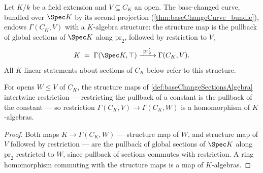 \begin{definition}
  \label{def:baseChangeSectionsAlgebra}
  \leanok
  Let \(K/k\) be a field extension and \(V \subseteq C_K\) an open. The base-changed
  curve, bundled over \(\Spec K\) by its second projection
  (\ref{thm:baseChangeCurve_bundle}), endows \(\Gamma(C_K, V)\) with a \(K\)-algebra
  structure: the structure map is the pullback of global sections of \(\Spec K\) along
  \(\mathrm{pr}_2\), followed by restriction to \(V\),
  \[
    K \;=\; \Gamma(\Spec K, \top) \xrightarrow{\ \mathrm{pr}_2^{\sharp}\ }
      \Gamma(C_K, V).
  \]
  All \(K\)-linear statements about sections of \(C_K\) below refer to this structure.
\end{definition}

\begin{lemma}
  \label{lem:baseChangeResAlgHom}
  \leanok
  For opens \(W \le V\) of \(C_K\), the structure maps of
  \ref{def:baseChangeSectionsAlgebra} intertwine restriction --- restricting the
  pullback of a constant is the pullback of the constant --- so restriction
  \(\Gamma(C_K, V) \to \Gamma(C_K, W)\) is a homomorphism of \(K\)-algebras.
\end{lemma}
\begin{proof}
  \leanok
  Both maps \(K \to \Gamma(C_K, W)\) --- structure map of \(W\), and structure map of
  \(V\) followed by restriction --- are the pullback of global sections of \(\Spec K\)
  along \(\mathrm{pr}_2\) restricted to \(W\), since pullback of sections commutes with
  restriction. A ring homomorphism commuting with the structure maps is a map of
  \(K\)-algebras.
\end{proof}

